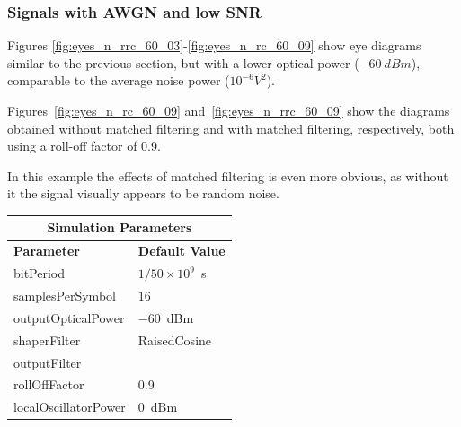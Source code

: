 \begin{refsection}
\subsubsection*{Signals with AWGN and low SNR}
Figures \ref{fig:eyes_n_rrc_60_03}-\ref{fig:eyes_n_rc_60_09} show eye
diagrams similar to the previous section, but with a lower optical power ($-60~dBm$),
comparable to the average noise power ($10^{-6} V^2$).



Figures~\ref{fig:eyes_n_rc_60_09} and~\ref{fig:eyes_n_rrc_60_09} show the
diagrams obtained without matched filtering and with matched filtering,
respectively, both using a roll-off factor of 0.9.

In this example the effects of matched filtering is even more obvious, as
without it the signal visually appears to be random noise.
\begin{table}[H]
	\centering
	\footnotesize
	\begin{tabular}{|l|l|}
		\hline
		\multicolumn{2}{|c|}{ \textbf{Simulation Parameters} } \\
		\hline
		\textbf{Parameter}     & \textbf{Default Value}                                     \\\hline
		bitPeriod              & $1/50\times10^9$~s														\\\hline
		samplesPerSymbol       & $16$                                                       \\\hline
		outputOpticalPower     & $-60$~dBm 													\\ \hline
		shaperFilter	       & RaisedCosine												\\ \hline
		outputFilter		   &                											\\ \hline
		rollOffFactor		   & 0.9														\\ \hline
		localOscillatorPower   & $0$~dBm                                                    \\ \hline

\end{tabular}
\end{table}
\end{refsection}
